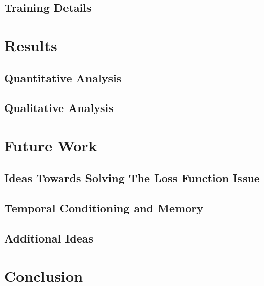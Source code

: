 \documentclass[12pt]{article}
\begin{document}
\subsection{Training Details} \label{ssec:43}

\newpage\section{Results} \label{sec:results}
\subsection{Quantitative Analysis} \label{ssec:51}
\subsection{Qualitative Analysis} \label{ssec:52}

\newpage\section{Future Work} \label{sec:future}
\subsection{Ideas Towards Solving The Loss Function Issue} \label{ssec:61}
\subsection{Temporal Conditioning and Memory} \label{ssec:62}
\subsection{Additional Ideas} \label{ssec:63}

\newpage\section{Conclusion} \label{sec:conclusion}



\newpage
\end{document}
